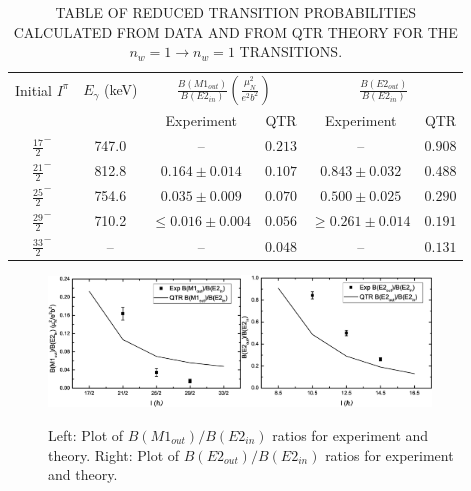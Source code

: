 \begin{table}
\begin{center}
\caption{TABLE OF REDUCED TRANSITION PROBABILITIES CALCULATED FROM DATA AND FROM QTR THEORY FOR THE $n_w=1 \rightarrow n_w=1$ TRANSITIONS.\label{tbl:chp4-transitition-ratios}}
\begin{tabular}{|c|c|c|c|c|c|}
\hline
Initial $I^\pi{}$ &$E_{\gamma}$ (keV) & \multicolumn{2}{c|}{ $\frac{B(M1_{out})}{B(E2_{in})}(\frac{\mu_N^2}{e^2b^2})$} & \multicolumn{2}{c|}{$\frac{B(E2_{out})}{B(E2_{in})}$} \\
& & Experiment & QTR & Experiment & QTR \\
\hline
$\frac{17}{2}^-$ & 747.0 & -- & $0.213$ & -- & $0.908$ \\
$\frac{21}{2}^-$ & 812.8 &  $0.164\pm0.014$ & $0.107$ &  $0.843\pm0.032$ & $0.488$ \\
$\frac{25}{2}^-$ & 754.6 &   $0.035\pm0.009$ & $0.070$ &  $0.500\pm0.025$ & $0.290$ \\
$\frac{29}{2}^-$ & 710.2 & $\leq0.016\pm0.004$ & $0.056$ & $\geq 0.261\pm0.014$ & $0.191$ \\
$\frac{33}{2}^-$ & -- & -- & $0.048$ & -- & $0.131$ \\
\bottomrule
\end{tabular}
\end{center}
\end{table}

\begin{figure}[th!]
\centerline{\includegraphics[width=0.455\textwidth]{./img/c4/m1_trans_prob.eps}\hspace{0.08\textwidth}\includegraphics[width=0.45\textwidth]{./img/c4/e2_trans_prob.eps}}
	\caption{Left: Plot of $B(M1_{out})/B(E2_{in})$ ratios for experiment and theory. Right: Plot of $B(E2_{out})/B(E2_{in})$ ratios for experiment and theory.\label{fig:chp4-trans-prob-ratios}}
\end{figure}

